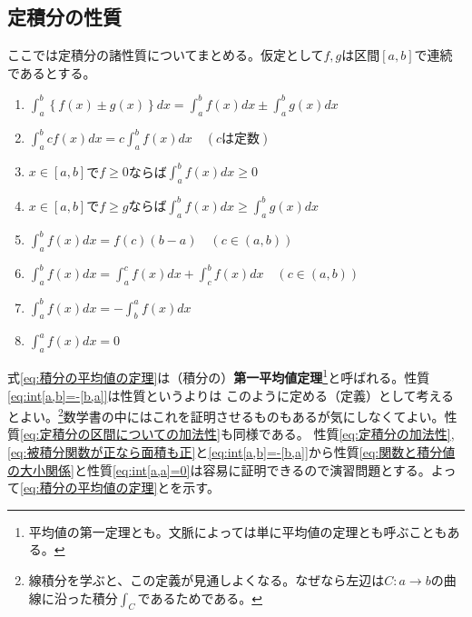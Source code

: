 \documentclass[a4j,dvipdfmx]{jsarticle}
\begin{document}
            \subsection{定積分の性質}
                ここでは定積分の諸性質についてまとめる。仮定として$f,g$は区間$[a,b]$で連続であるとする。
                \begin{enumerate}\setcounter{enumi}{0}\renewcommand{\labelenumi}{(\arabic{enumi})}
                    \item $\displaystyle \int_a^b \left\{f(x)\pm g(x)\right\}dx=\int_a^b f(x)dx\pm\int_a^b g(x)dx\label{eq:定積分の加法性}$
                    \item $\displaystyle \int_a^b cf(x)dx=c\int_a^b f(x)dx \quad (c\text{は定数})$
                    \item $x\in [a,b]$で$f\geq 0$ならば$\displaystyle\int_a^b f(x)dx\geq 0 \label{eq:被積分関数が正なら面積も正}$
                    \item $x\in [a,b]$で$f\geq g$ならば$\displaystyle\int_a^b f(x)dx\geq \int_a^b g(x)dx\label{eq:関数と積分値の大小関係}$
                    \item $\displaystyle \int_a^b f(x)dx = f(c)(b-a)\quad (c\in (a,b))\label{eq:積分の平均値の定理}$
                    \item $\displaystyle \int_a^bf(x)dx=\int_a^c f(x)dx+\int_c^b f(x)dx \quad(c\in(a,b))\label{eq:定積分の区間についての加法性}$
                    \item $\displaystyle \int_a^b f(x)dx = -\int_b^a f(x)dx\label{eq:int[a,b]=-[b,a]}$
                    \item $\displaystyle \int_a^a f(x)dx=0\label{eq:int[a,a]=0}$
                \end{enumerate}
                式\eqref{eq:積分の平均値の定理}は（積分の）\textbf{第一平均値定理}\footnote{平均値の第一定理とも。文脈によっては単に平均値の定理とも呼ぶこともある。}と呼ばれる。性質\eqref{eq:int[a,b]=-[b,a]}は性質というよりは
                このように定める（定義）として考えるとよい。\footnote{線積分を学ぶと、この定義が見通しよくなる。なぜなら左辺は$C:a\to b$の曲線に沿った積分$\int_C$であるためである。}数学書の中にはこれを証明させるものもあるが気にしなくてよい。性質\eqref{eq:定積分の区間についての加法性}も同様である。
                性質\eqref{eq:定積分の加法性},\eqref{eq:被積分関数が正なら面積も正}と\eqref{eq:int[a,b]=-[b,a]}から性質\eqref{eq:関数と積分値の大小関係}と性質\eqref{eq:int[a,a]=0}は容易に証明できるので演習問題とする。よって\eqref{eq:積分の平均値の定理}とを示す。
\end{document}
